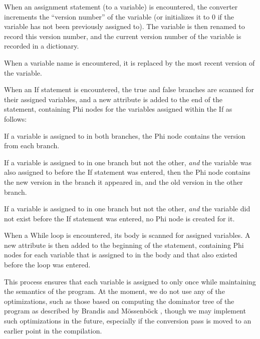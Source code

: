 \documentclass[11pt,twocolumn]{article}
\newenvironment{packed_enum}{
\begin{enumerate}
  \setlength{\itemsep}{1pt}
  \setlength{\parskip}{0pt}
  \setlength{\parsep}{0pt}
}{\end{enumerate}}
\begin{document}
\begin{packed_enum}
\item When an assignment statement (to a variable) is encountered, the
  converter increments the ``version number'' of the variable (or
  initializes it to $0$ if the variable has not been previously
  assigned to). The variable is then renamed to record this version
  number, and the current version number of the variable is recorded
  in a dictionary.
\item When a variable name is encountered, it is replaced by the most
  recent version of the variable.
\item When an If statement is encountered, the true and false branches
  are scanned for their assigned variables, and a new attribute is
  added to the end of the statement, containing Phi nodes for the
  variables assigned within the If as follows:
  \begin{packed_enum}
  \item If a variable is assigned to in both branches, the Phi node
    contains the version from each branch.
  \item If a variable is assigned to in one branch but not the other,
    \textit{and} the variable was also assigned to before the If
    statement was entered, then the Phi node contains the new version
    in the branch it appeared in, and the old version in the other
    branch.
  \item If a variable is assigned to in one branch but not the other,
    \textit{and} the variable did not exist before the If
    statement was entered, no Phi node is created for it.
  \end{packed_enum}
\item When a While loop is encountered, its body is scanned for
  assigned variables. A new attribute is then added to the beginning
  of the statement, containing Phi nodes for each variable that is
  assigned to in the body and that also existed before the loop was
  entered.
\end{packed_enum}

This process ensures that each variable is assigned to only once while
maintaining the semantics of the program. At the moment, we do not use
any of the optimizations, such as those based on computing the
dominator tree of the program as described by Brandis and
M\"{o}ssenb\"{ock} \cite{brandis-mossenbock}, though we may implement such
optimizations in the future, especially if the conversion pass is
moved to an earlier point in the compilation.
\end{document}

